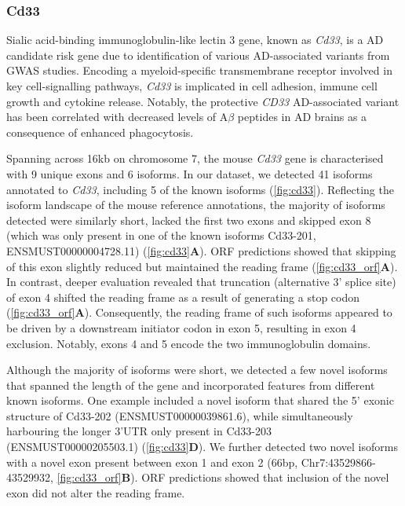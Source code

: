 \newpage
\subsubsection{Cd33}
\label{ch5: cd33_annotation}
Sialic acid-binding immunoglobulin-like lectin 3 gene, known as \textit{Cd33}, is a AD candidate risk gene due to identification of various AD-associated variants from GWAS studies. Encoding a myeloid-specific transmembrane receptor involved in key cell-signalling pathways, \textit{Cd33} is implicated in cell adhesion, immune cell growth and cytokine release\cite{Griciuc2019}. Notably, the protective \textit{CD33} AD-associated variant has been correlated with decreased levels of A$\beta$ peptides in AD brains as a consequence of enhanced phagocytosis\cite{Bhattacherjee2021}. 

Spanning across 16kb on chromosome 7, the mouse \textit{Cd33} gene is characterised with 9 unique exons and 6 isoforms. In our dataset, we detected 41 isoforms annotated to \textit{Cd33}, including 5 of the known isoforms (\cref{fig:cd33}). Reflecting the isoform landscape of the mouse reference annotations, the majority of isoforms detected were similarly short, lacked the first two exons and skipped exon 8 (which was only present in one of the known isoforms Cd33-201, ENSMUST00000004728.11) (\cref{fig:cd33}\textbf{A}). ORF predictions showed that skipping of this exon slightly reduced but maintained the reading frame (\cref{fig:cd33_orf}\textbf{A}). In contrast, deeper evaluation revealed that truncation (alternative 3' splice site) of exon 4 shifted the reading frame as a result of generating a stop codon (\cref{fig:cd33_orf}\textbf{A}). Consequently, the reading frame of such isoforms appeared to be driven by a downstream initiator codon in exon 5, resulting in exon 4 exclusion. Notably, exons 4 and 5 encode the two immunoglobulin domains.  

Although the majority of isoforms were short, we detected a few novel isoforms that spanned the length of the gene and incorporated features from different known isoforms. One example included a novel isoform that shared the 5' exonic structure of Cd33-202 (ENSMUST00000039861.6), while simultaneously harbouring the longer 3'UTR only present in Cd33-203 (ENSMUST00000205503.1) (\cref{fig:cd33}\textbf{D}). We further detected two novel isoforms with a novel exon present between exon 1 and exon 2  (66bp, Chr7:43529866-43529932, \cref{fig:cd33_orf}\textbf{B}). ORF predictions showed that inclusion of the novel exon did not alter the reading frame. 

